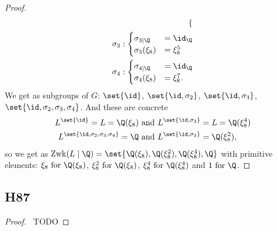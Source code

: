 \begin{proof}
\begin{align*}
\begin{cases}
		\end{cases}\\
		\sigma_3:\begin{cases}
		\sigma_{3\mid \Q} &= \id_{\Q}\\
		\sigma_3(\xi_8) &= \xi_8^5
		\end{cases}\\
		\sigma_4:\begin{cases}
		\sigma_{4\mid \Q} &= \id_{\Q}\\
		\sigma_4(\xi_8) &= \xi_8^7.
		\end{cases}
	\end{align*}
	We get as subgroups of $G$: $\set{\id}$, $\set{\id, \sigma_2}$, $\set{\id, \sigma_3}$, $\set{\id, \sigma_2, \sigma_3, \sigma_4}$. And these are concrete
	\begin{align*}
		L^{\set{\id}} = L = \Q(\xi_8) &\and L^{\set{\id, \sigma_2}} = L = \Q(\xi^4_8)\\
		L^{\set{\id, \sigma_2, \sigma_3, \sigma_4}} = \Q &\and L^{\set{\id, \sigma_3}} = \Q(\xi^2_8),
	\end{align*}
	so we get as $\Zwk(L \mid \Q) = \set{\Q(\xi_8), \Q(\xi^2_8), \Q(\xi^4_8), \Q}$ with primitive elements: $\xi_8 \for \Q(\xi_8)$, $\xi_8^2 \for \Q(\xi_8)$, $\xi_8^4 \for \Q(\xi^4_8)$ and $1 \for \Q$.
\end{proof}

\subsection{H87}
\begin{proof}\
	TODO
\end{proof}

